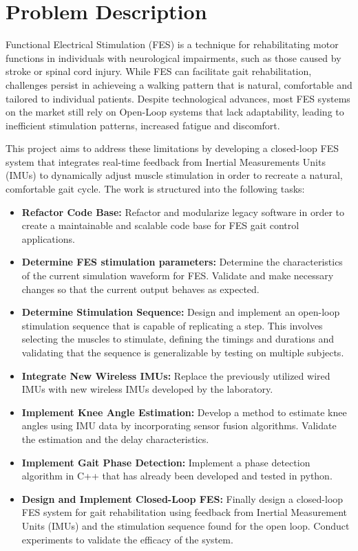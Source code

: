 
\section{Problem Description}

Functional Electrical Stimulation (FES) is a technique for rehabilitating motor functions in individuals with neurological impairments, such as those caused by stroke or spinal cord injury. While FES can facilitate gait rehabilitation, challenges persist in achieveing a walking pattern that is natural, comfortable and tailored to individual patients. Despite technological advances, most FES systems on the market still rely on Open-Loop systems that lack adaptability, leading to inefficient stimulation patterns, increased fatigue and discomfort.

This project aims to address these limitations by developing a closed-loop FES system that integrates real-time feedback from Inertial Measurements Units (IMUs) to dynamically adjust muscle stimulation in order to recreate a natural, comfortable gait cycle. The work is structured into the following tasks:
\begin{itemize}
    \item \textbf{Refactor Code Base:} Refactor and modularize legacy software in order to create a maintainable and scalable code base for FES gait control applications.
    \item \textbf{Determine FES stimulation parameters:} Determine the characteristics of the current simulation waveform for FES. Validate and make necessary changes so that the current output behaves as expected.
    \item \textbf{Determine Stimulation Sequence:} Design and implement an open-loop stimulation sequence that is capable of replicating a step. This involves selecting the muscles to stimulate, defining the timings and durations and validating that the sequence is generalizable by testing on multiple subjects.
    \item \textbf{Integrate New Wireless IMUs:} Replace the previously utilized wired IMUs with new wireless IMUs developed by the laboratory.
    \item \textbf{Implement Knee Angle Estimation:} Develop a method to estimate knee angles using IMU data by incorporating sensor fusion algorithms. Validate the estimation and the delay characteristics.
    \item \textbf{Implement Gait Phase Detection:} Implement a phase detection algorithm in C++ that has already been developed and tested in python.
    \item \textbf{Design and Implement Closed-Loop FES:} Finally design a closed-loop FES system for gait rehabilitation using feedback from Inertial Measurement Units (IMUs) and the stimulation sequence found for the open loop. Conduct experiments to validate the efficacy of the system.
\end{itemize}

